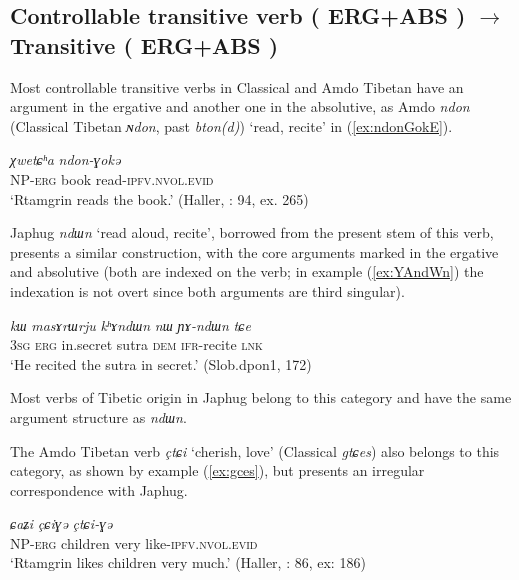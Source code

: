 \documentclass[oneside,a4paper,11pt]{article}
\makeatletter
\newcommand{\ipa}[1]{{\phon\textit{\mbox{#1}}}} %
\newcommand{\refb}[1]{(\ref{#1})}
\def\fakesc#1{%
  \begingroup%
  \xdef\fake@name{\csname\curr@fontshape/\f@size\endcsname}%
  \fontsize{\fontdimen8\fake@name}{\baselineskip}\selectfont%
  \uppercase{#1}%
  \endgroup%
}
\makeatother
\begin{document}
\subsection{Controllable transitive verb (\fakesc{erg+abs})  $\rightarrow$ Transitive (\fakesc{erg+abs})}
Most controllable transitive verbs in Classical and Amdo Tibetan have an argument in the ergative and another one in the absolutive, as Amdo \ipa{ndon} (Classical Tibetan \ipa{ɴdon}, past \ipa{bton(d)}) `read, recite' in \refb{ex:ndonGokE}.


\begin{exe}
\ex \label{ex:ndonGokE}
\gll \ipa{ʂtamɖʐən-ɣə}  \ipa{χwetɕʰa}  \ipa{ndon-ɣokə} \\
NP-\textsc{erg} book read-\textsc{ipfv.nvol.evid} \\
\glt `Rtamgrin reads the book.' (Haller, \citeyear{haller04themchen}: 94, ex. 265)
\end{exe}


Japhug \ipa{ndɯn} `read aloud, recite', borrowed from the present stem of this verb, presents a similar construction, with the core arguments marked in the ergative and absolutive (both are indexed on the verb; in example \refb{ex:YAndWn} the indexation is not overt since both arguments are third singular).

\begin{exe}
\ex \label{ex:YAndWn}
\gll \ipa{ɯʑo} 	\ipa{kɯ} 	\ipa{masɤrɯrju} 	\ipa{kʰɤndɯn} 	\ipa{nɯ} 	\ipa{ɲɤ-ndɯn} 	\ipa{tɕe} \\
\textsc{3sg} \textsc{erg} in.secret sutra \textsc{dem} \textsc{ifr}-recite \textsc{lnk} \\
\glt `He recited the sutra in secret.' (Slob.dpon1, 172)
\end{exe}

Most verbs of Tibetic origin in Japhug belong to this category and have the same argument structure as \ipa{ndɯn}. 

The Amdo Tibetan verb \ipa{çtɕi} `cherish, love' (Classical \ipa{gtɕes}) also belongs to this category, as shown by example \refb{ex:gces}, but presents an irregular correspondence with Japhug.

\begin{exe}
\ex \label{ex:gces}
\gll \ipa{ʂtamɖʐən-ɣə}  \ipa{ɕaʑi} \ipa{çɕiɣə}  \ipa{çtɕi-ɣə} \\
NP-\textsc{erg} children very like-\textsc{ipfv.nvol.evid} \\
\glt `Rtamgrin likes children very much.' (Haller, \citeyear{haller04themchen}: 86, ex: 186)
\end{exe}
\end{document}
